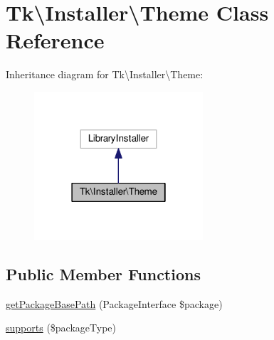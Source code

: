 \hypertarget{classTk_1_1Installer_1_1Theme}{\section{Tk\textbackslash{}Installer\textbackslash{}Theme Class Reference}
\label{classTk_1_1Installer_1_1Theme}
}


Inheritance diagram for Tk\textbackslash{}Installer\textbackslash{}Theme\+:\nopagebreak
\begin{figure}[H]
\begin{center}
\leavevmode
\includegraphics[width=178pt]{classTk_1_1Installer_1_1Theme__inherit__graph}
\end{center}
\end{figure}
\subsection*{Public Member Functions}
\begin{DoxyCompactItemize}
\item 
\hyperlink{classTk_1_1Installer_1_1Theme_a0ecba5ea55c243ae31a85b86d4e48325}{get\+Package\+Base\+Path} (Package\+Interface \$package)
\item 
\hyperlink{classTk_1_1Installer_1_1Theme_a8c0eac85363028c2c17d7cc31ae6e1fa}{supports} (\$package\+Type)
\end{DoxyCompactItemize}


